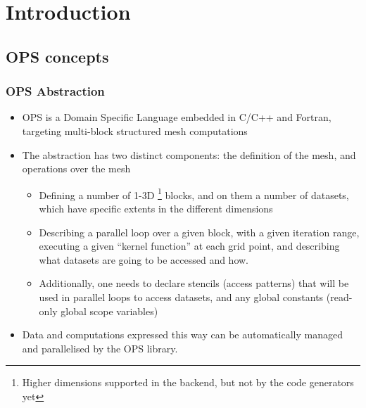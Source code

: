 \documentclass{beamer}
\begin{document}
\section{Introduction} %

\subsection{OPS concepts} 

\begin{frame}
\frametitle{OPS Abstraction}
\begin{itemize}
\item
OPS is a Domain Specific Language embedded in C/C++ and Fortran, targeting multi-block structured mesh computations

\item The abstraction has two distinct components: the definition of the mesh, and operations over the mesh
\begin{itemize}
\item Defining a number of 1-3D \footnote{Higher dimensions supported in the backend, but not by the code generators yet} blocks, and on them a number of datasets, which have specific extents in the different dimensions
\item Describing a parallel loop over a given block, with a given iteration range, executing a given ``kernel function'' at each grid point, and describing what datasets are going to be accessed and how.
\item Additionally, one needs to declare stencils (access patterns) that will be used in parallel loops to access datasets, and any global constants (read-only global scope variables)
\end{itemize}
\item Data and computations expressed this way can be automatically managed and parallelised by the OPS library.
\end{itemize}

\end{frame}
\end{document}
